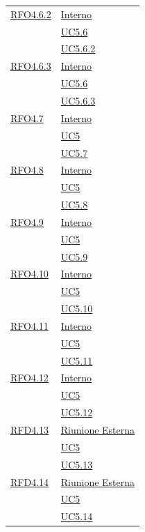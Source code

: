 \begin{longtable}{|>{\centering}m{5cm}|m{5cm}<{\centering}|}
\hyperlink{RFO4.6.2}{RFO4.6.2} & \hyperlink{Interno}{Interno}\\
& \hyperref[UC5.6]{UC5.6}\\
& \hyperref[UC5.6.2]{UC5.6.2}\\ \hline

\hyperlink{RFO4.6.3}{RFO4.6.3} & \hyperlink{Interno}{Interno}\\
& \hyperref[UC5.6]{UC5.6}\\
& \hyperref[UC5.6.3]{UC5.6.3}\\ \hline

\hyperlink{RFO4.7}{RFO4.7} & \hyperlink{Interno}{Interno}\\
& \hyperref[UC5]{UC5}\\
& \hyperref[UC5.7]{UC5.7}\\ \hline

\hyperlink{RFO4.8}{RFO4.8} & \hyperlink{Interno}{Interno}\\
& \hyperref[UC5]{UC5}\\
& \hyperref[UC5.8]{UC5.8}\\ \hline

\hyperlink{RFO4.9}{RFO4.9} & \hyperlink{Interno}{Interno}\\
& \hyperref[UC5]{UC5}\\
& \hyperref[UC5.9]{UC5.9}\\ \hline

\hyperlink{RFO4.10}{RFO4.10} & \hyperlink{Interno}{Interno}\\
& \hyperref[UC5]{UC5}\\
& \hyperref[UC5.10]{UC5.10}\\ \hline

\hyperlink{RFO4.11}{RFO4.11} & \hyperlink{Interno}{Interno}\\
& \hyperref[UC5]{UC5}\\
& \hyperref[UC5.11]{UC5.11}\\ \hline

\hyperlink{RFO4.12}{RFO4.12} & \hyperlink{Interno}{Interno}\\
& \hyperref[UC5]{UC5}\\
& \hyperref[UC5.12]{UC5.12}\\ \hline

\hyperlink{RFD4.13}{RFD4.13} & \hyperlink{Riunione Esterna}{Riunione Esterna}\\
& \hyperref[UC5]{UC5}\\
& \hyperref[UC5.13]{UC5.13}\\ \hline

\hyperlink{RFD4.14}{RFD4.14} & \hyperlink{Riunione Esterna}{Riunione Esterna}\\
& \hyperref[UC5]{UC5}\\
& \hyperref[UC5.14]{UC5.14}\\ \hline


\end{longtable}
